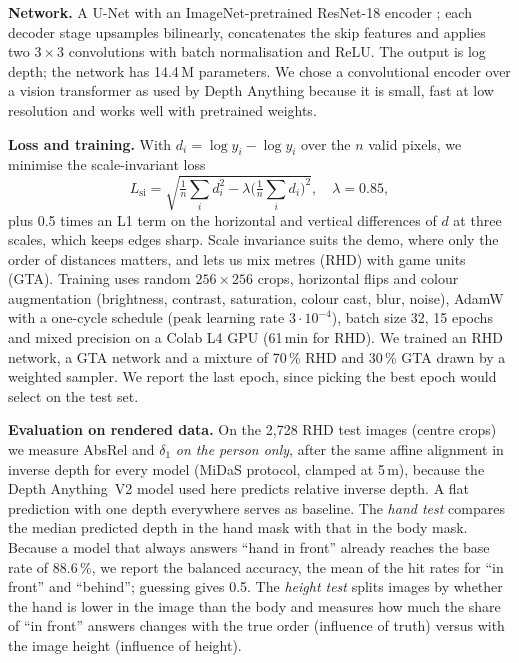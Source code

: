 \documentclass[../../proceedings/main.tex]{subfiles}
\begin{document}
\begin{refsection}
\textbf{Network.} A U-Net \autocite{gamedepth-ronneberger2015} with an
ImageNet-pretrained ResNet-18 encoder \autocite{gamedepth-he2016}; each
decoder stage upsamples bilinearly, concatenates the skip features and applies
two $3\times3$ convolutions with batch normalisation and ReLU. The output is
log depth; the network has 14.4\,M parameters. We chose a convolutional
encoder over a vision transformer as used by Depth Anything because it is
small, fast at low resolution and works well with pretrained weights.

\textbf{Loss and training.} With $d_i=\log\hat y_i-\log y_i$ over the $n$
valid pixels, we minimise the scale-invariant loss \autocite{gamedepth-eigen2014}
\begin{equation}
  L_{\mathrm{si}}=\sqrt{\tfrac{1}{n}\textstyle\sum_i d_i^2-\lambda\big(\tfrac{1}{n}\sum_i d_i\big)^2},\quad \lambda=0.85,
  \label{eq:gamedepth-loss}
\end{equation}
plus 0.5 times an L1 term on the horizontal and vertical differences of $d$ at
three scales, which keeps edges sharp. Scale invariance suits the demo, where
only the order of distances matters, and lets us mix metres (RHD) with game
units (GTA). Training uses random $256\times256$ crops, horizontal flips and
colour augmentation (brightness, contrast, saturation, colour cast, blur,
noise), AdamW with a one-cycle schedule (peak learning rate $3\cdot10^{-4}$),
batch size 32, 15 epochs and mixed precision on a Colab L4 GPU (61\,min for
RHD). We trained an RHD network, a GTA network and a mixture of 70\,\% RHD and
30\,\% GTA drawn by a weighted sampler. We report the last epoch, since picking
the best epoch would select on the test set.

\textbf{Evaluation on rendered data.} On the 2{,}728 RHD test images
(centre crops) we measure AbsRel and $\delta_1$ \emph{on the person only},
after the same affine alignment in inverse depth for every model (MiDaS
protocol, clamped at 5\,m), because the Depth Anything~V2 model used here
predicts relative inverse depth. A flat prediction with one depth everywhere serves as baseline.
The \emph{hand test} compares the median predicted depth in the hand mask with
that in the body mask. Because a model that always answers ``hand in front''
already reaches the base rate of 88.6\,\%, we report the balanced accuracy,
the mean of the hit rates for ``in front'' and ``behind''; guessing gives 0.5.
The \emph{height test} splits images by whether the hand is lower in the image
than the body and measures how much the share of ``in front'' answers changes
with the true order (influence of truth) versus with the image height
(influence of height).


\end{refsection}
\end{document}
